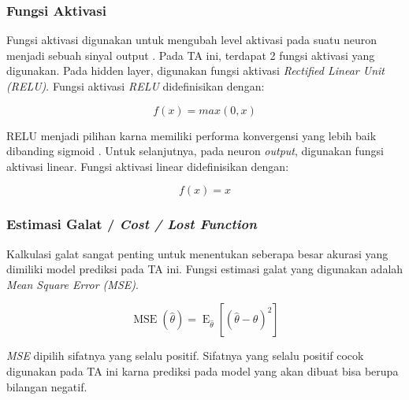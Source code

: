 \subsubsection{Fungsi Aktivasi}
    Fungsi aktivasi digunakan untuk mengubah level aktivasi pada suatu neuron menjadi sebuah sinyal output \cite{KarlicOlgacPerformanceAnalysis}. Pada TA ini, terdapat 2 fungsi aktivasi yang digunakan. Pada hidden layer, digunakan fungsi aktivasi \emph{Rectified Linear Unit (RELU)}. Fungsi aktivasi \emph{RELU} didefinisikan dengan\cite{glorot2011deep}:

    \begin{equation}
        f(x) = max(0, x)
    \end{equation}

    RELU menjadi pilihan karna memiliki performa konvergensi yang lebih baik dibanding sigmoid \cite{Krizhevsky:2012:ICD:2999134.2999257}. Untuk selanjutnya, pada neuron \emph{output}, digunakan fungsi aktivasi linear. Fungsi aktivasi linear didefinisikan dengan\cite{MLBishop}:

    \begin{equation}
        f(x) = x
    \end{equation}

\subsubsection{Estimasi Galat / \emph{Cost / Lost Function}}
    Kalkulasi galat sangat penting untuk menentukan seberapa besar akurasi yang dimiliki model prediksi pada TA ini. Fungsi estimasi galat yang digunakan adalah \emph{Mean Square Error (MSE)}.

    \begin{equation}
        \operatorname{MSE}(\hat{\theta})=\operatorname{E}_{\hat{\theta}}\left[(\hat{\theta}-\theta)^2\right]
    \end{equation}

    \emph{MSE} dipilih sifatnya yang selalu positif. Sifatnya yang selalu positif cocok digunakan pada TA ini karna prediksi pada model yang akan dibuat bisa berupa bilangan negatif.
